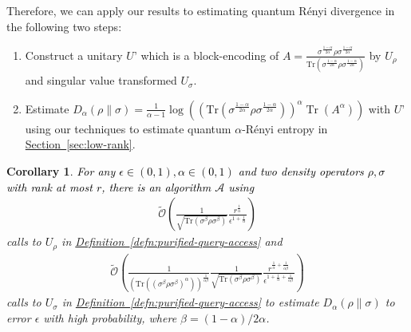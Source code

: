 \documentclass[journal]{IEEEtran}
\newtheorem{corollary}{Corollary}
\newcommand{\defn}[1]{\hyperref[defn:#1]{Definition~\ref*{defn:#1}}}
\renewcommand{\sec}[1]{\hyperref[sec:#1]{Section~\ref*{sec:#1}}}
\begin{document}
Therefore, we can apply our results to estimating quantum R{\'e}nyi divergence in the following two steps: 
\begin{enumerate}
    \item Construct a unitary $U’$ which is a block-encoding of $A = \frac{\sigma^{\frac{1-\alpha}{2 \alpha}} \rho \sigma^{\frac{1-\alpha}{2 \alpha}}}{\mathrm{Tr}(\sigma^{\frac{1-\alpha}{2 \alpha}} \rho \sigma^{\frac{1-\alpha}{2 \alpha}})}$  by $U_{\rho}$ and singular value transformed $U_{\sigma}$.
    
    \item Estimate $D_\alpha(\rho \| \sigma)=\frac{1}{\alpha-1} \log((\mathrm{Tr}(\sigma^{\frac{1-\alpha}{2 \alpha}} \rho \sigma^{\frac{1-\alpha}{2 \alpha}}))^{\alpha}\operatorname{Tr}(A^{\alpha}))$ with $U’$ using our techniques to estimate quantum $\alpha$-R{\'e}nyi entropy in \sec{low-rank}.
\end{enumerate}

\begin{corollary}
\textcolor{black}{For any $\epsilon\in (0,1),\alpha \in (0,1)$ and two density operators $\rho,\sigma$ with rank at most $r$, there is an algorithm $\mathcal{A}$ using }
\begin{align}
\widetilde{\mathcal{O}}\left(\frac{1}{\sqrt{\mathrm{Tr}(\sigma^{\beta}\rho\sigma^{\beta})}}\frac{r^{\frac{1}{\alpha}}}{\epsilon^{1+\frac{1}{\alpha}}}\right)
\end{align}
calls to $U_{\rho}$ in \defn{purified-query-access} and 
\begin{align}
\widetilde{\mathcal{O}}\left(\frac{1}{(\mathrm{Tr}((\sigma^{\beta}\rho\sigma^{\beta})^{\alpha}))^{\frac{1}{\alpha\beta}}}\frac{1}{\sqrt{\mathrm{Tr}(\sigma^{\beta}\rho\sigma^{\beta})}}\frac{r^{\frac{1}{\alpha}+\frac{1}{\alpha\beta}}}{\epsilon^{1+\frac{1}{\alpha}+\frac{1}{\alpha\beta}}}\right)
\end{align}
calls to $U_{\sigma}$ in \defn{purified-query-access} to estimate $D_{\alpha}(\rho\|\sigma)$ to error $\epsilon$ with high probability, where $\beta = (1-\alpha)/2\alpha$. 
\end{corollary}
\end{document}
